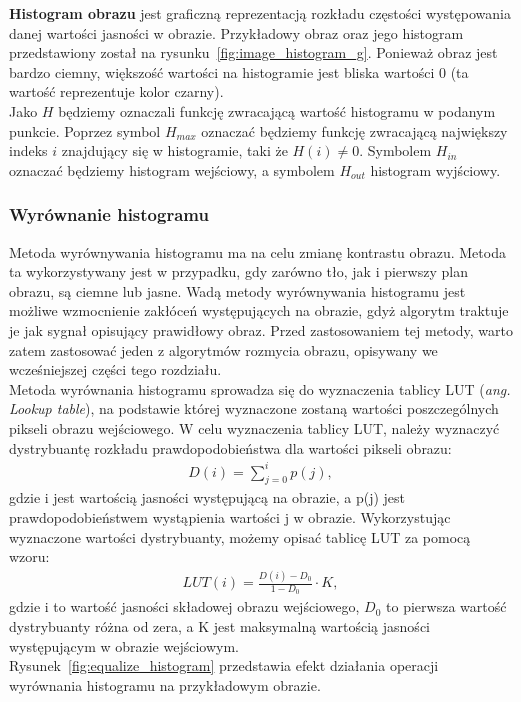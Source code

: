 \textbf{Histogram obrazu} jest graficzną reprezentacją rozkładu częstości występowania danej wartości jasności w obrazie. Przykładowy obraz oraz jego histogram przedstawiony został na rysunku~\ref{fig:image_histogram_g}. Ponieważ obraz jest bardzo ciemny, większość wartości na histogramie jest bliska wartości 0 (ta wartość reprezentuje kolor czarny).\\
Jako $H$ będziemy oznaczali funkcję zwracającą wartość histogramu w podanym punkcie. Poprzez symbol $H_{max}$ oznaczać będziemy funkcję zwracającą największy indeks $i$ znajdujący się w histogramie, taki że $H(i) \neq 0$. Symbolem $H_{in}$ oznaczać będziemy histogram wejściowy, a symbolem $H_{out}$ histogram wyjściowy.\\

\subsubsection{Wyrównanie histogramu}
Metoda wyrównywania histogramu ma na celu zmianę kontrastu obrazu. Metoda ta wykorzystywany jest w przypadku, gdy zarówno tło, jak i pierwszy plan obrazu, są ciemne lub jasne. Wadą metody wyrównywania histogramu jest możliwe wzmocnienie zakłóceń występujących na obrazie, gdyż algorytm traktuje je jak sygnał opisujący prawidłowy obraz. Przed zastosowaniem tej metody, warto zatem zastosować jeden z algorytmów rozmycia obrazu, opisywany we wcześniejszej części tego rozdziału.\\
Metoda wyrównania histogramu sprowadza się do wyznaczenia tablicy LUT (\textit{ang. Lookup table}), na podstawie której wyznaczone zostaną wartości poszczególnych pikseli obrazu wejściowego. W celu wyznaczenia tablicy LUT, należy wyznaczyć dystrybuantę rozkładu prawdopodobieństwa dla wartości pikseli obrazu:
\begin{gather*}
  D(i) = \sum\limits_{j=0}^i p(j),
\end{gather*}
gdzie i jest wartością jasności występującą na obrazie, a p(j) jest prawdopodobieństwem wystąpienia wartości j w obrazie. Wykorzystując wyznaczone wartości dystrybuanty, możemy opisać tablicę LUT za pomocą wzoru:
\begin{gather*}
  LUT(i) = \frac{D(i)-D_0}{1-D_0} \cdot K,
\end{gather*}
gdzie i to wartość jasności składowej obrazu wejściowego, $D_0$ to pierwsza wartość dystrybuanty różna od zera, a K jest maksymalną wartością jasności występującym w obrazie wejściowym.\\
Rysunek~\ref{fig:equalize_histogram} przedstawia efekt działania operacji wyrównania histogramu na przykładowym obrazie.
